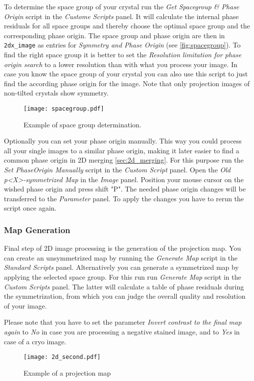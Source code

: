 To determine the space group of your crystal run the \textit{Get Spacegroup \& Phase Origin}  script in the \textit{Custome Scripts} panel. It will calculate the internal phase residuals for all space groups and thereby choose the optimal space group and the corresponding phase origin. The space group and phase origin are then in \texttt{2dx\_image} as entries for \textit{Symmetry and Phase Origin} (see \autoref{fig:spacegroup}). To find the right space group it is better to set the \textit{Resolution limitation for phase origin search} to a lower resolution than with what you process your image. In case you know the space group of your crystal you can also use this script to just find the according phase origin for the image. Note that only projection images of non-tilted crystals show symmetry.

\begin{figure}
		\centering
		\texttt{[image: spacegroup.pdf]}
		\caption{Example of space group determination.}
		\label{fig:spacegroup}
	\end{figure}

Optionally you can set your phase origin manually. This way you could process all your single images to a similar phase origin, making it later easier to find a common phase origin in 2D merging \autoref{sec:2d_merging}. For this purpose run the \textit{Set PhaseOrigin Manually} script in the  \textit{Custom Script} panel. Open the  \textit{Old p<X>-symmetrized Map} in the  \textit{Image} panel. 
Position your mouse cursor on the wished phase origin and press shift "P". The needed phase origin changes will be transferred to the  \textit{Parameter} panel. To apply the changes you have to rerun the script once again.

	
\subsubsection{Map Generation}	

Final step of 2D image processing is the generation of the projection map. You can create an unsymmetrized map by running the \textit{Generate Map} script in the \textit{Standard Scripts} panel. Alternatively you can generate a symmetrized map by applying the selected space group. For this run run \textit{Generate Map} script in the \textit{Custom Scripts} panel. The latter will calculate a table of phase residuals during the symmetrization, from which you can judge the overall quality and resolution of your image. 

Please note that you have to set the parameter \textit{Invert contrast to the final map again} to \textit{No} in case you are processing a negative stained image, and to \textit{Yes} in case of a cryo image. 


	\begin{figure}[H]
		\centering
		\texttt{[image: 2d\_second.pdf]}
		\caption{Example of a projection map}
		\label{fig:2d_second}
	\end{figure}
	

	
		
